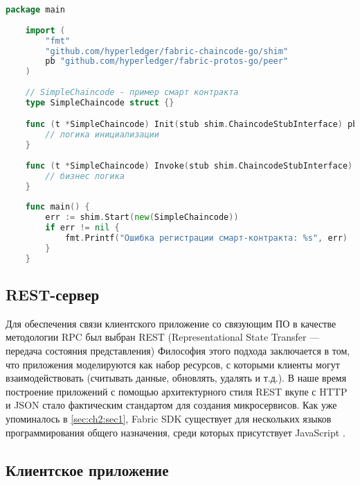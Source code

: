 \begin{lstlisting}[caption={Реализация Chaincode},label={lst:chaincode-impl},language=Go]
	package main
	
	import (
		"fmt"
		"github.com/hyperledger/fabric-chaincode-go/shim"
		pb "github.com/hyperledger/fabric-protos-go/peer"
	)
	
	// SimpleChaincode - пример смарт контракта
	type SimpleChaincode struct {}

	func (t *SimpleChaincode) Init(stub shim.ChaincodeStubInterface) pb.Response {
		// логика инициализации
	}
	
	func (t *SimpleChaincode) Invoke(stub shim.ChaincodeStubInterface) pb.Response {
		// бизнес логика
	}
	
	func main() {
		err := shim.Start(new(SimpleChaincode))
		if err != nil {
			fmt.Printf("Ошибка регистрации смарт-контракта: %s", err)
		}
	}
\end{lstlisting}


\subsection{REST-сервер} \label{subsec:ch2/sec2/subsec3}
Для обеспечения связи клиентского приложение со связующим ПО в качестве методологии RPC был выбран REST (Representational State Transfer — передача состояния представления)\cite{restful} Философия этого подхода заключается в том, что приложения моделируются как набор ресурсов, с которыми клиенты могут взаимодействовать (считывать данные, обновлять, удалять и т.д.). В наше время построение приложений с помощью архитектурного стиля REST вкупе с HTTP и JSON \cite{js-json} стало фактическим стандартом для создания микросервисов.
Как уже упоминалось в \ref{sec:ch2:sec1}, Fabric SDK существует для нескольких языков программирования общего назначения, среди которых присутствует JavaScript \cite{pure-js}. 

\subsection{Клиентское приложение}
 \label{subsec:ch2/sec2/subsec3}
 
